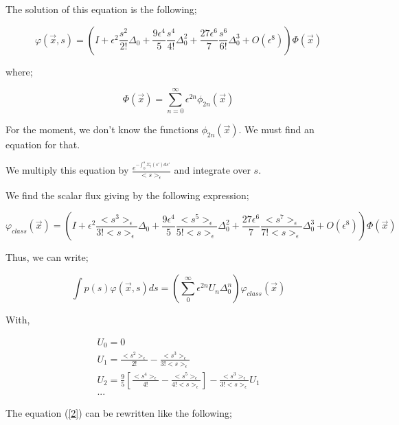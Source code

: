 \documentclass[a4paper, 12pt]{report}
\newcommand{\bl}{\big<}
\newcommand{\bg}{\big>}
\begin{document}
\begin{appendix}
The solution of this equation is the following;

\begin{equation}
\varphi (\vec{x},s) = \left( I + \epsilon^2 \frac{s^2}{2!}\Delta_0 + \frac{9\epsilon^4}{5} \frac{s^4}{4!}\Delta_0^2 + \frac{27\epsilon^6}{7}\frac{s^6}{6!}\Delta_0^3 + O(\epsilon^8) \right) \Phi(\vec{x})
\end{equation}

where;

\begin{equation}
\Phi(\vec{x}) = \sum_{n=0}^{\infty} \epsilon^{2n} \phi_{2n}(\vec{x})
\end{equation}

For the moment, we don't know the functions $ \phi_{2n}(\vec{x})$. We must find an equation for that.

We multiply this equation by $ \frac{e^{-\int_0^s\Sigma_t(s')ds'}}{\bl s \bg_\epsilon}$ and integrate over $s$.

We find the scalar flux giving by the following expression;

\begin{equation}
\varphi_{class}(\vec{x}) = \left( I + \epsilon^2 \frac{\bl s^3 \bg_\epsilon}{3!\bl s \bg_\epsilon}\Delta_0 +  \frac{9\epsilon^4}{5} \frac{\bl s^5 \bg_\epsilon}{5!\bl s \bg_\epsilon}\Delta_0^2 + \frac{27\epsilon^6}{7}\frac{\bl s^7 \bg_\epsilon}{7!\bl s \bg_\epsilon}\Delta_0^3 + O(\epsilon^8) \right) \Phi(\vec{x})
\end{equation}


Thus, we can write;

\begin{equation}
\int p(s) \varphi(\vec{x},s) ds = \left( \sum_0^\infty \epsilon^{2n} U_{n} \Delta_0^n \right) \varphi_{class}(\vec{x})
\end{equation}

With,

\begin{align}
U_0 = 0 \\
U_1 = \frac{\bl s^2 \bg_\epsilon}{2!} - \frac{\bl s^3 \bg_\epsilon}{3!\bl s \bg_\epsilon}\\
U_2 = \frac{9}{5}\left[ \frac{\bl s^4 \bg_\epsilon}{4!} - \frac{\bl s^5 \bg_\epsilon}{4!\bl s \bg_\epsilon} \right] - \frac{\bl s^3 \bg_\epsilon}{3! \bl s \bg_\epsilon}U_1 \\
...
\end{align}

The equation (\ref{2}) can be rewritten like the following;


\end{appendix}
\end{document}
